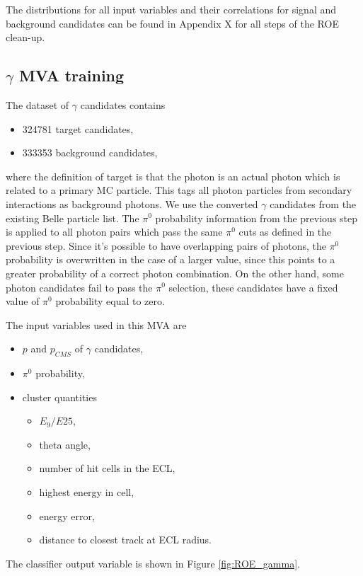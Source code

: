 \documentclass[oneside,a4paper,openany,12pt]{scrbook}
\begin{document}
The distributions for all input variables and their correlations for signal and background candidates can be found in Appendix X for all steps of the ROE clean-up.


\subsection{$\gamma$ MVA training}

The dataset of $\gamma$ candidates contains
\begin{itemize}
\item 324781 target candidates,
\item 333353 background candidates,
\end{itemize}
where the definition of target is that the photon is an actual photon which is related to a primary MC particle. This tags all photon particles from secondary interactions as background photons. We use the converted $\gamma$ candidates from the existing Belle particle list. The $\pi^0$ probability information from the previous step is applied to all photon pairs which pass the same $\pi^0$ cuts as defined in the previous step. Since it's possible to have overlapping pairs of photons, the $\pi^0$ probability is overwritten in the case of a larger value, since this points to a greater probability of a correct photon combination. On the other hand, some photon candidates fail to pass the $\pi^0$ selection, these candidates have a fixed value of $\pi^0$ probability equal to zero.

The input variables used in this MVA are
\begin{itemize}
\item $p$ and $p_{CMS}$ of $\gamma$ candidates,
\item $\pi^0$ probability,
\item cluster quantities
	\begin{itemize}
	\item $E_9/E{25}$,
	\item theta angle,
	\item number of hit cells in the ECL,
	\item highest energy in cell,
	\item energy error,
	\item distance to closest track at ECL radius.
	\end{itemize}
\end{itemize}

The classifier output variable is shown in Figure \ref{fig:ROE_gamma}.
\end{document}
